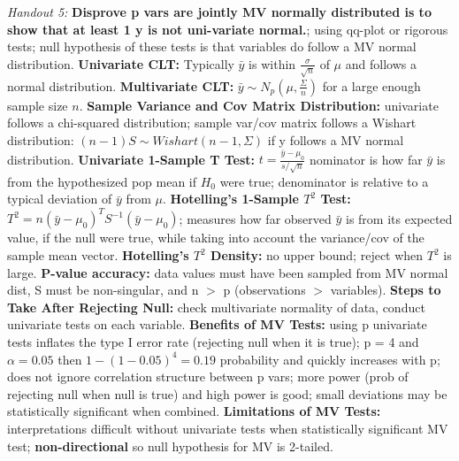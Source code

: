 \documentclass[9pt]{extarticle}
\begin{document}
\textit{Handout 5:}
\textbf{Disprove p vars are jointly MV normally distributed is to show that 
at least 1 y is not uni-variate normal.}; using qq-plot or rigorous tests; null
hypothesis of these tests is that variables do follow a MV normal distribution.
\textbf{Univariate CLT:} Typically $\bar{y}$ is within $\frac{\sigma}{\sqrt{n}}$ 
of $\mu$ and follows a normal distribution.
\textbf{Multivariate CLT:} $\bar{y} \sim N_p(\mu, \frac{\Sigma}{n})$ for a large 
enough sample size $n$.
\textbf{Sample Variance and Cov Matrix Distribution:} univariate follows a 
chi-squared distribution; sample var/cov matrix follows a Wishart distribution:
$(n-1)S \sim Wishart(n-1, \Sigma)$ if y follows a MV normal distribution.
\textbf{Univariate 1-Sample T Test:} $t = \frac{\bar{y} - \mu_0}{s/\sqrt{n}}$ 
nominator is how far $\bar{y}$ is from the hypothesized pop mean if $H_0$ were 
true; denominator is relative to a typical deviation of $\bar{y}$ from $\mu$.
\textbf{Hotelling's 1-Sample $T^2$ Test:} $T^2 = n(\bar{y} - \mu_0)^TS^{-1}
(\bar{y} - \mu_0)$; measures how far observed $\bar{y}$ is from its expected
value, if the null were true, while taking into account the variance/cov of the 
sample mean vector.
\textbf{Hotelling's $T^2$ Density:} no upper bound; reject when $T^2$ is large.
\textbf{P-value accuracy:} data values must have been sampled from MV normal 
dist, S must be non-singular, and n $>$ p (observations $>$ variables).
\textbf{Steps to Take After Rejecting Null:} check multivariate normality of 
data, conduct univariate tests on each variable.
\textbf{Benefits of MV Tests:} using p univariate tests inflates the type I
error rate (rejecting null when it is true); p = 4 and $\alpha = 0.05$ then
$1 - (1 - 0.05)^4 = 0.19$ probability and quickly increases with p; does not
ignore correlation structure between p vars; more power (prob of rejecting 
null when null is true) and high power is good; small deviations may be
statistically significant when combined.
\textbf{Limitations of MV Tests:} interpretations difficult without univariate
tests when statistically significant MV test; \textbf{non-directional} so
null hypothesis for MV is 2-tailed.\\
\end{document}
